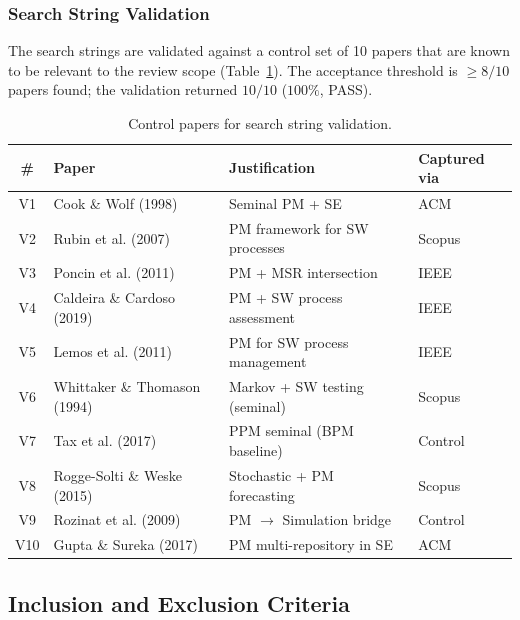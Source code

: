 \subsubsection{Search String Validation}

The search strings are validated against a control set of 10 papers that are
known to be relevant to the review scope
(Table~\ref{tab:validation-set}). The acceptance threshold is $\geq 8/10$
papers found; the validation returned $10/10$ ($100\%$, PASS).

\begin{table}[htbp]
\centering
\caption{Control papers for search string validation.}
\label{tab:validation-set}
\small
\setlength{\tabcolsep}{4pt}
\begin{tabular}{c p{4.5cm} p{4.1cm} p{1.6cm}}
\toprule
\textbf{\#} & \textbf{Paper} & \textbf{Justification} & \textbf{Captured via} \\
\midrule
V1  & Cook \& Wolf (1998)            & Seminal PM + SE                    & ACM \\
V2  & Rubin et al. (2007)            & PM framework for SW processes      & Scopus \\
V3  & Poncin et al. (2011)           & PM + MSR intersection              & IEEE \\
V4  & Caldeira \& Cardoso (2019)     & PM + SW process assessment         & IEEE \\
V5  & Lemos et al. (2011)            & PM for SW process management       & IEEE \\
V6  & Whittaker \& Thomason (1994)   & Markov + SW testing (seminal)      & Scopus \\
V7  & Tax et al. (2017)              & PPM seminal (BPM baseline)         & Control \\
V8  & Rogge-Solti \& Weske (2015)    & Stochastic + PM forecasting        & Scopus \\
V9  & Rozinat et al. (2009)          & PM $\rightarrow$ Simulation bridge & Control \\
V10 & Gupta \& Sureka (2017)         & PM multi-repository in SE          & ACM \\
\bottomrule
\end{tabular}
\end{table}


\subsection{Inclusion and Exclusion Criteria}
\label{sec:slr-criteria}

